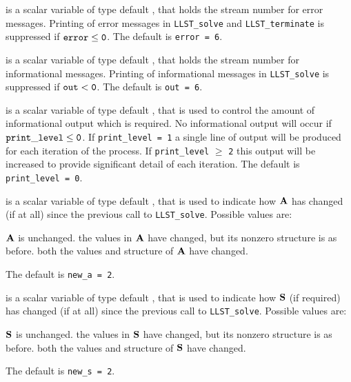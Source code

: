 \documentclass{galahad}
\newcommand{\packagename}{LLST}
\begin{document}
\begin{description}
 is a scalar variable of type default \integer, that holds the
stream number for error messages.
Printing of error messages in
{\tt \packagename\_solve} and {\tt \packagename\_terminate}
is suppressed if ${\tt error} \leq {\tt 0}$.
The default is {\tt error = 6}.

 is a scalar variable of type default \integer, that holds the
stream number for informational messages.
Printing of informational messages in
{\tt \packagename\_solve} is suppressed if ${\tt out} < {\tt 0}$.
The default is {\tt out = 6}.

 is a scalar variable of type default \integer,
that is used
to control the amount of informational output which is required. No
informational output will occur if ${\tt print\_level} \leq {\tt 0}$. If
{\tt print\_level = 1} a single line of output will be produced for each
iteration of the process. If {\tt print\_level} $\geq$ {\tt 2} this output
will be increased to provide significant detail of each iteration.
The default is {\tt print\_level = 0}.


 is a scalar variable of type default \integer, that is used
to indicate how ${\mathbf{A}}$ has changed (if at all) since the previous
call to {\tt \packagename\_solve}. Possible values are:
\begin{description}
 ${\mathbf{A}}$ is unchanged.
 the values in ${\mathbf{A}}$ have changed, but its nonzero structure
is as before.
 both the values and structure of ${\mathbf{A}}$ have changed.
\end{description}
The default is {\tt new\_a = 2}.

 is a scalar variable of type default \integer, that is used
to indicate how ${\mathbf{S}}$ (if required) has changed (if at all) since the previous
call to {\tt \packagename\_solve}. Possible values are:
\begin{description}
 ${\mathbf{S}}$ is unchanged.
 the values in ${\mathbf{S}}$ have changed, but its nonzero structure
is as before.
 both the values and structure of ${\mathbf{S}}$ have changed.
\end{description}
The default is {\tt new\_s = 2}.


\end{description}
\end{document}
